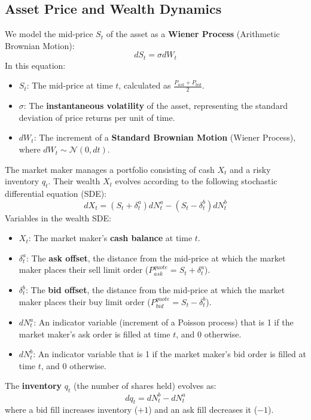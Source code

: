 \subsection{Asset Price and Wealth Dynamics}
We model the mid-price $S_t$ of the asset as a \textbf{Wiener Process} (Arithmetic Brownian Motion):
\begin{equation}
    dS_t = \sigma dW_t
\end{equation}
In this equation:
\begin{itemize}
    \item $S_t$: The mid-price at time $t$, calculated as $\frac{P_{ask} + P_{bid}}{2}$.
    \item $\sigma$: The \textbf{instantaneous volatility} of the asset, representing the standard deviation of price returns per unit of time.
    \item $dW_t$: The increment of a \textbf{Standard Brownian Motion} (Wiener Process), where $dW_t \sim \mathcal{N}(0, dt)$.
\end{itemize}

The market maker manages a portfolio consisting of cash $X_t$ and a risky inventory $q_t$. Their wealth $X_t$ evolves according to the following stochastic differential equation (SDE):
\begin{equation}
    dX_t = (S_t + \delta^a_t) dN^a_t - (S_t - \delta^b_t) dN^b_t
\end{equation}
Variables in the wealth SDE:
\begin{itemize}
    \item $X_t$: The market maker's \textbf{cash balance} at time $t$.
    \item $\delta^a_t$: The \textbf{ask offset}, the distance from the mid-price at which the market maker places their sell limit order ($P_{ask}^{quote} = S_t + \delta^a_t$).
    \item $\delta^b_t$: The \textbf{bid offset}, the distance from the mid-price at which the market maker places their buy limit order ($P_{bid}^{quote} = S_t - \delta^b_t$).
    \item $dN^a_t$: An indicator variable (increment of a Poisson process) that is 1 if the market maker's ask order is filled at time $t$, and 0 otherwise.
    \item $dN^b_t$: An indicator variable that is 1 if the market maker's bid order is filled at time $t$, and 0 otherwise.
\end{itemize}

The \textbf{inventory} $q_t$ (the number of shares held) evolves as:
\begin{equation}
    dq_t = dN^b_t - dN^a_t
\end{equation}
where a bid fill increases inventory ($+1$) and an ask fill decreases it ($-1$).

